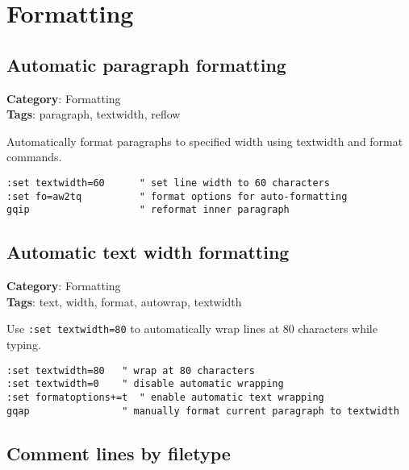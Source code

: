 {{{{{{\chapter{Formatting}
\section{Automatic paragraph formatting}

\textbf{Category}: Formatting\\ \textbf{Tags}: paragraph, textwidth, reflow
\vspace{0.5cm}

Automatically format paragraphs to specified width using textwidth and format commands.

\begin{Exa*}{}
\begin{Verbatim}[fontsize=\footnotesize, breaklines, breakanywhere]
:set textwidth=60      " set line width to 60 characters
:set fo=aw2tq          " format options for auto-formatting
gqip                   " reformat inner paragraph
\end{Verbatim}
\end{Exa*}

\section{Automatic text width formatting}

\textbf{Category}: Formatting\\ \textbf{Tags}: text, width, format, autowrap, textwidth
\vspace{0.5cm}

Use {\footnotesize \Verb§:set textwidth=80§} to automatically wrap lines at 80 characters while typing.

\begin{Exa*}{}
\begin{Verbatim}[fontsize=\footnotesize, breaklines, breakanywhere]
:set textwidth=80   " wrap at 80 characters
:set textwidth=0    " disable automatic wrapping
:set formatoptions+=t  " enable automatic text wrapping
gqap                " manually format current paragraph to textwidth
\end{Verbatim}
\end{Exa*}

\section{Comment lines by filetype}

}}}}}}
